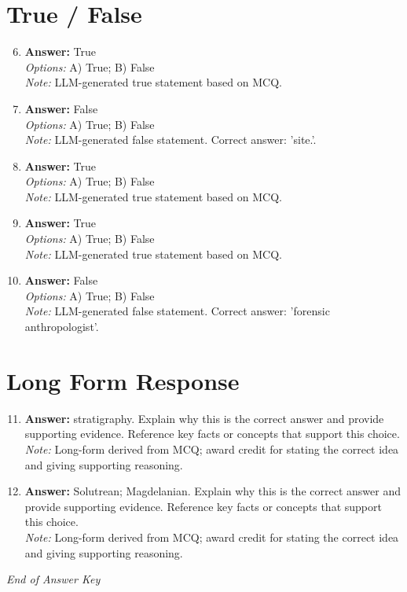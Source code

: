 \documentclass[12pt]{article}
\begin{document}
\section*{True / False}
\begin{enumerate}[label=\arabic*.]
\setcounter{enumi}{5}
\item \textbf{Answer:} True
\\ \textit{Options:} A) True; B) False
\\ \textit{Note:} LLM-generated true statement based on MCQ.
\item \textbf{Answer:} False
\\ \textit{Options:} A) True; B) False
\\ \textit{Note:} LLM-generated false statement. Correct answer: 'site.'.
\item \textbf{Answer:} True
\\ \textit{Options:} A) True; B) False
\\ \textit{Note:} LLM-generated true statement based on MCQ.
\item \textbf{Answer:} True
\\ \textit{Options:} A) True; B) False
\\ \textit{Note:} LLM-generated true statement based on MCQ.
\item \textbf{Answer:} False
\\ \textit{Options:} A) True; B) False
\\ \textit{Note:} LLM-generated false statement. Correct answer: 'forensic anthropologist'.
\end{enumerate}

\section*{Long Form Response}
\begin{enumerate}[label=\arabic*.]
\setcounter{enumi}{10}
\item \textbf{Answer:} stratigraphy. Explain why this is the correct answer and provide supporting evidence. Reference key facts or concepts that support this choice.
\\ \textit{Note:} Long-form derived from MCQ; award credit for stating the correct idea and giving supporting reasoning.
\item \textbf{Answer:} Solutrean; Magdelanian. Explain why this is the correct answer and provide supporting evidence. Reference key facts or concepts that support this choice.
\\ \textit{Note:} Long-form derived from MCQ; award credit for stating the correct idea and giving supporting reasoning.
\end{enumerate}

\vfill
\noindent\textit{End of Answer Key}
\end{document}
